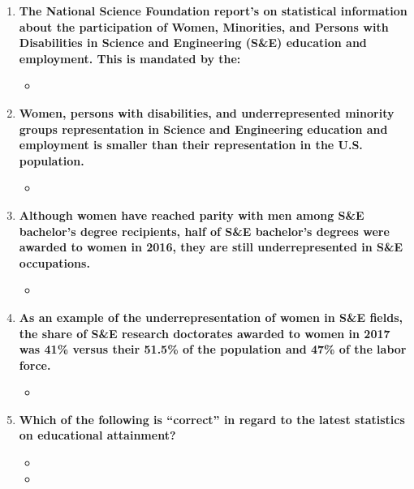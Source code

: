 \documentclass[12pt,a4paper]{article}
\begin{document}
  \clearpage
  \begin{center}
    \large{}
  \end{center}
  \begin{enumerate}
    \item \textbf{The National Science Foundation report's on statistical information about the participation of Women, Minorities, and Persons with Disabilities in Science and Engineering (S\&E) education and employment. This is mandated by the:}
    \begin{itemize}
      \item {}
    \end{itemize}
    \item \textbf{Women, persons with disabilities, and underrepresented minority groups representation in Science and Engineering education and employment is smaller than their representation in the U.S. population.}
    \begin{itemize}
      \item {}
    \end{itemize}
    \item \textbf{Although women have reached parity with men among S\&E bachelor's degree recipients, half of S\&E bachelor's degrees were awarded to women in 2016, they are still underrepresented in S\&E occupations.}
    \begin{itemize}
      \item {}
    \end{itemize}
    \item \textbf{As an example of the underrepresentation of women in S\&E fields, the share of S\&E research doctorates awarded to women in 2017 was 41\% versus their 51.5\% of the population and 47\% of the labor force.}
    \begin{itemize}
      \item {}
    \end{itemize}
    \item \textbf{Which of the following is ``correct'' in regard to the latest statistics on educational attainment?}
    \begin{itemize}
      \item {}
      \item {}

\end{itemize}
\end{enumerate}
\end{document}
